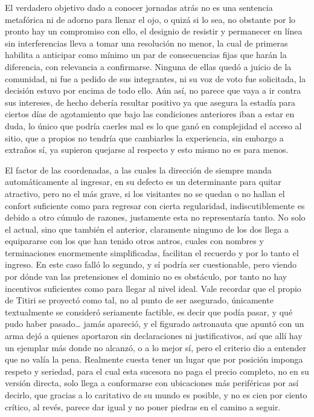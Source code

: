 \documentclass[
]{book}
\begin{document}
El verdadero objetivo dado a conocer jornadas atrás no es una sentencia metafórica ni de adorno para llenar el ojo, o quizá si lo sea, no obstante por lo pronto hay un compromiso con ello, el designio de resistir y permanecer en línea sin interferencias lleva a tomar una resolución no menor, la cual de primeras habilita a anticipar como mínimo un par de consecuencias fijas que harán la diferencia, con relevancia a confirmarse. Ninguna de ellas quedó a juicio de la comunidad, ni fue a pedido de sus integrantes, ni su voz de voto fue solicitada, la decisión estuvo por encima de todo ello. Aún así, no parece que vaya a ir contra sus intereses, de hecho debería resultar positivo ya que asegura la estadía para ciertos días de agotamiento que bajo las condiciones anteriores iban a estar en duda, lo único que podría caerles mal es lo que ganó en complejidad el acceso al sitio, que a propios no tendría que cambiarles la experiencia, sin embargo a extraños sí, ya supieron quejarse al respecto y esto mismo no es para menos.

El factor de las coordenadas, a las cuales la dirección de siempre manda automáticamente al ingresar, en su defecto es un determinante para quitar atractivo, pero no el más grave, si los visitantes no se quedan o no hallan el confort suficiente como para regresar con cierta regularidad, indiscutiblemente es debido a otro cúmulo de razones, justamente esta no representaría tanto. No solo el actual, sino que también el anterior, claramente ninguno de los dos llega a equipararse con los que han tenido otros antros, cuales con nombres y terminaciones enormemente simplificadas, facilitan el recuerdo y por lo tanto el ingreso. En este caso falló lo segundo, y sí podría ser cuestionable, pero viendo por dónde van las pretensiones el dominio no es obstáculo, por tanto no hay incentivos suficientes como para llegar al nivel ideal. Vale recordar que el propio de Titiri se proyectó como tal, no al punto de ser asegurado, únicamente textualmente se consideró seriamente factible, es decir que podía pasar, y qué pudo haber pasado\ldots{} jamás apareció, y el figurado astronauta que apuntó con un arma dejó a quienes aportaron sin declaraciones ni justificativos, así que allí hay un ejemplar más donde no alcanzó, o a lo mejor sí, pero el criterio dio a entender que no valía la pena. Realmente cuesta tener un lugar que por posición imponga respeto y seriedad, para el cual esta sucesora no paga el precio completo, no en su versión directa, solo llega a conformarse con ubicaciones más periféricas por así decirlo, que gracias a lo caritativo de su mundo es posible, y no es cien por ciento crítico, al revés, parece dar igual y no poner piedras en el camino a seguir.
\end{document}
